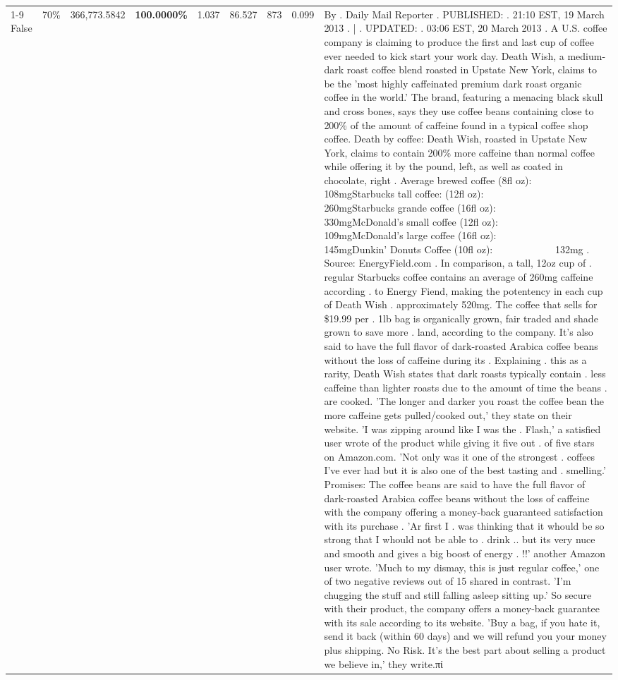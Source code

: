 \begin{table}[H]
{\begin{tabular}{lllrlllll}
\cline{1-9} \cline{2-9}
False & 70\% & 366,773.5842 & \bfseries \color{red} 100.0000\% & 1.037 & 86.527 & 873 & 0.099 & By . Daily Mail Reporter . PUBLISHED: . 21:10 EST, 19 March 2013 . | . UPDATED: . 03:06 EST, 20 March 2013 . A U.S. coffee company is claiming to produce the first and last cup of coffee ever needed to kick start your work day. Death Wish, a medium-dark roast coffee blend roasted in Upstate New York, claims to be the 'most highly caffeinated premium dark roast organic coffee in the world.' The brand, featuring a menacing black skull and cross bones, says they use coffee beans containing close to 200\% of the amount of caffeine found in a typical coffee shop coffee. Death by coffee: Death Wish, roasted in Upstate New York, claims to contain 200\% more caffeine than normal coffee while offering it by the pound, left, as well as coated in chocolate, right . Average brewed coffee (8fl oz):              108mgStarbucks tall coffee: (12fl oz):                260mgStarbucks grande coffee (16fl oz):         330mgMcDonald's small coffee (12fl oz):           109mgMcDonald's large coffee (16fl oz):           145mgDunkin' Donuts Coffee (10fl oz):             132mg . Source: EnergyField.com . In comparison, a tall, 12oz cup of . regular Starbucks coffee contains an average of 260mg caffeine according . to Energy Fiend, making the potentency in each cup of Death Wish . approximately 520mg. The coffee that sells for \$19.99 per . 1lb bag is organically grown, fair traded and shade grown to save more . land, according to the company. It's also said to have the full flavor of dark-roasted Arabica coffee beans without the loss of caffeine during its . Explaining . this as a rarity, Death Wish states that dark roasts typically contain . less caffeine than lighter roasts due to the amount of time the beans . are cooked. 'The longer and darker you roast the coffee bean the more caffeine gets pulled/cooked out,' they state on their website. 'I was zipping around like I was the . Flash,' a satisfied user wrote of the product while giving it five out . of five stars on Amazon.com. 'Not only was it one of the strongest . coffees I've ever had but it is also one of the best tasting and . smelling.’ Promises: The coffee beans are said to have the full flavor of dark-roasted Arabica coffee beans without the loss of caffeine with the company offering a money-back guaranteed satisfaction with its purchase . 'Ar first I . was thinking that it whould be so strong that I whould not be able to . drink .. but its very nuce and smooth and gives a big boost of energy . !!' another Amazon user wrote. 'Much to my dismay, this is just regular coffee,' one of two negative reviews out of 15 shared in contrast. 'I'm chugging the stuff and still falling asleep sitting up.' So secure with their product, the company offers a money-back guarantee with its sale according to its website. 'Buy a bag, if you hate it, send it back (within 60 days) and we will refund you your money plus shipping. No Risk. It’s the best part about selling a product we believe in,' they write.πί \\

\end{tabular}}
\end{table}
